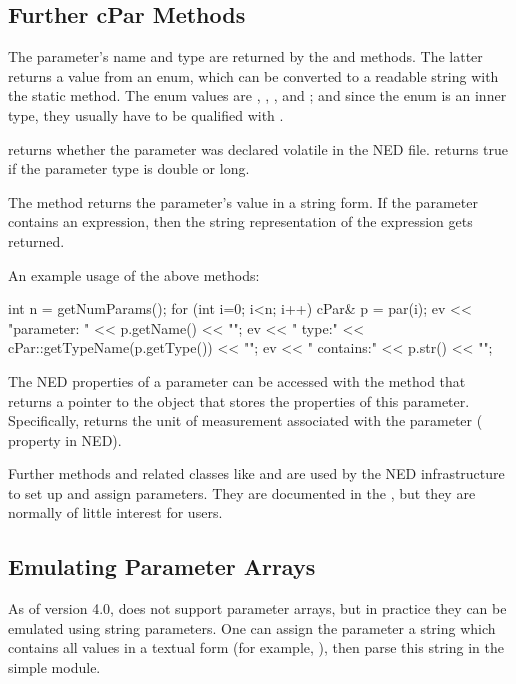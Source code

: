 \subsection{Further cPar Methods}

The parameter's name and type are returned by the  and
 methods. The latter returns a value from an enum,
which can be converted to a readable string with the 
static method. The enum values are , , ,
 and ; and since the enum is an inner type,
they usually have to be qualified with .

 returns whether the parameter was declared volatile
in the NED file.  returns true if the parameter
type is double or long.

The  method returns the parameter's value in a string form.
If the parameter contains an expression, then the string representation
of the expression gets returned.

An example usage of the above methods:

\begin{cpp}
int n = getNumParams();
for (int i=0; i<n; i++)
{
    cPar& p = par(i);
    ev << "parameter: " << p.getName() << "\n";
    ev << "  type:" << cPar::getTypeName(p.getType()) << "\n";
    ev << "  contains:" << p.str() << "\n";
}
\end{cpp}

The NED properties of a parameter can be accessed with the 
method that returns a pointer to the  object that stores
the properties of this parameter. Specifically,  returns
the unit of measurement associated with the parameter ( property in NED).

Further  methods and related classes like  and
 are used by the NED infrastructure to set up and
assign parameters. They are documented in the , but
they are normally of little interest for users.


\subsection{Emulating Parameter Arrays}

As of version 4.0, {\opp} does not support parameter arrays,
but in practice they can be emulated using string parameters.
One can assign the parameter a string which contains all values
in a textual form (for example, ), then
parse this string in the simple module.

